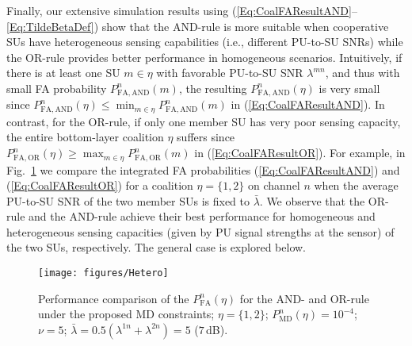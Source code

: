 \documentclass[journal,draftclsnofoot,onecolumn]{IEEEtran}
\theoremstyle{definition}
\def\FigScale{0.6}
\def\FigScale{0.65}
\begin{document}
Finally, our extensive simulation results using (\ref{Eq:CoalFAResultAND}--\ref{Eq:TildeBetaDef}) show that the AND-rule is more suitable when cooperative SUs have heterogeneous sensing capabilities (i.e., different PU-to-SU SNRs) while the OR-rule provides better performance in homogeneous scenarios. Intuitively, if there is at least one SU $m\in\eta$ with favorable PU-to-SU SNR $\lambda^{mn}$, and thus with small FA probability $P^n_\mathrm{FA,AND}(m)$, the resulting $P^n_\mathrm{FA,AND}(\eta)$ is very small since $P^n_\mathrm{FA,AND}(\eta)\leq \min_{m\in \eta}P^n_\mathrm{FA,AND}(m)$ in (\ref{Eq:CoalFAResultAND}). In contrast, for the OR-rule, if only one member SU has very poor sensing capacity, the entire bottom-layer coalition $\eta$ suffers since $P^n_\mathrm{FA,OR}(\eta)\geq \max_{m\in \eta}P^n_\mathrm{FA,OR}(m)$ in (\ref{Eq:CoalFAResultOR}). For example, in Fig.~\ref{Fig:Hetero} we compare the integrated FA probabilities (\ref{Eq:CoalFAResultAND}) and (\ref{Eq:CoalFAResultOR}) for a coalition $\eta=\{1,2\}$ on channel $n$ when the average PU-to-SU SNR of the two member SUs is fixed to $\bar\lambda$. We observe that the OR-rule and the AND-rule achieve their best performance for homogeneous and heterogeneous sensing capacities (given by PU signal strengths at the sensor) of the two SUs, respectively.  The general case is explored below\cite{YLuThesis}.

\begin{figure}[!t]
    \centering
    \texttt{[image: figures/Hetero]}
    \caption{Performance comparison of the $P_{\mathrm{FA}}^n(\eta )$ for the AND- and OR-rule under the proposed MD constraints; $\eta=\{1,2\}$; $P_{{\mathrm{MD}}}^n(\eta )=10^{-4}$; $\nu=5$; $\bar{\lambda}=0.5(\lambda^{1n}+\lambda^{2n})=5$ ($7$\,dB).}
    \label{Fig:Hetero}
\end{figure}
\end{document}
